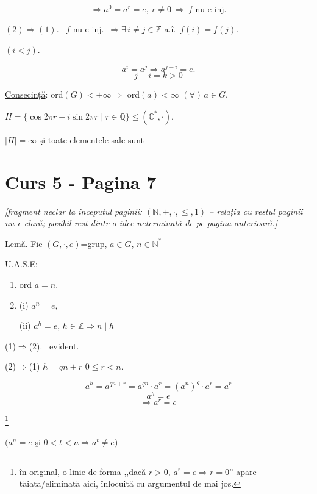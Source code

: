 \[
\Rightarrow a^0=a^r=e, \ r\neq 0 \ \Rightarrow \ f \text{ nu e inj.}
\]

\bigskip
\noindent $(2)\Rightarrow(1)$. \ $f$ nu e inj.\ $\Rightarrow \exists\, i\neq j\in\mathbb{Z}$ a.î.\ $f(i)=f(j)$.

\noindent $(i<j)$.

\[
a^i=a^j \Rightarrow a^{j-i}=e.
\]
\[
j-i=k>0
\]

\bigskip
\noindent\underline{Consecință}: ord$(G)<+\infty \Rightarrow$ ord$(a)<\infty$ $(\forall)\,a\in G$.

\bigskip
\noindent $H=\{\cos 2\pi r+i\sin 2\pi r \mid r\in\mathbb{Q}\} \leq (\mathbb{C}^*,\cdot)$.

\noindent $|H|=\infty$ şi toate elementele sale sunt



\section*{Curs 5 - Pagina 7}

\noindent\textit{[fragment neclar la începutul paginii: $(\mathbb{N},+,\cdot,\leq,1)$ -- relația cu restul paginii nu e clară; posibil rest dintr-o idee neterminată de pe pagina anterioară.]}

\bigskip
\noindent\underline{Lemă}. Fie $(G,\cdot,e)$=grup, $a\in G$, $n\in\mathbb{N}^*$

\noindent U.A.S.E:

\begin{enumerate}
\item[(1)] ord $a=n$.
\item[(2)] (i) $a^n=e$,

\noindent (ii) $a^h=e$, $h\in\mathbb{Z} \Rightarrow n\mid h$
\end{enumerate}

\bigskip
\noindent (1)$\Rightarrow$(2). \ evident.

\bigskip
\noindent (2)$\Rightarrow$(1) \quad $h=qn+r$ \quad $0\leq r<n$.

\[
a^h = a^{qn+r} = a^{qn}\cdot a^r = (a^n)^q\cdot a^r = a^r
\]
\[
a^h=e
\]
\[
\Rightarrow a^r=e
\]

\noindent\footnote{în original, o linie de forma ,,dacă $r>0$, $a^r=e\Rightarrow r=0$'' apare tăiată/eliminată aici, înlocuită cu argumentul de mai jos.}

\bigskip
\begin{center}
$\big(a^n=e$ şi $0<t<n \Rightarrow a^t\neq e\big)$
\end{center}

